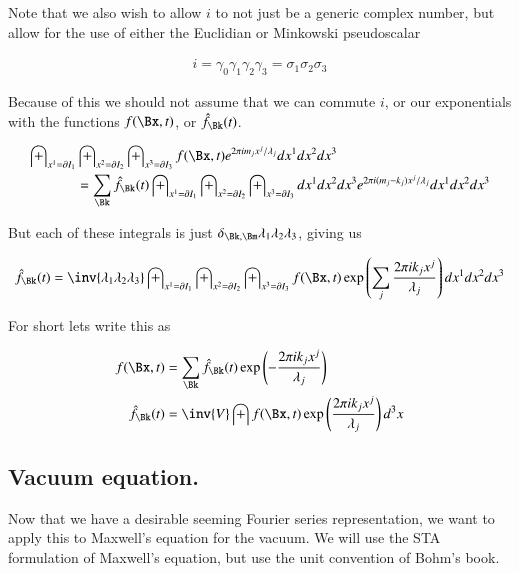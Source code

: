 \documentclass{article}
\begin{document}
Note that we also wish to allow $i$ to not just be a generic complex number, but allow for the use of either the Euclidian or Minkowski pseudoscalar

\begin{align*}
i = \gamma_0 \gamma_1 \gamma_2 \gamma_3 = \sigma_1 \sigma_2 \sigma_3
\end{align*}

Because of this we should not assume that we can commute $i$, or our exponentials with the functions $f(\Bx,t)$, or $\hat{f}_{\Bk}(t)$.

\begin{align*}
\int_{x^1 = \partial I_1} &\int_{x^2 = \partial I_2} \int_{x^3 = \partial I_3} f(\Bx, t) 
e^{ 2 \pi i m_j x^j/\lambda_j}
dx^1 dx^2 dx^3 \\
&= \sum_{\Bk} \hat{f}_{\Bk}(t) \int_{x^1 = \partial I_1} \int_{x^2 = \partial I_2} \int_{x^3 = \partial I_3} dx^1 dx^2 dx^3 e^{ 2 \pi i (m_j - k_j) x^j/\lambda_j} dx^1 dx^2 dx^3
\end{align*}

But each of these integrals is just $\delta_{\Bk,\Bm} \lambda_1 \lambda_2 \lambda_3$, giving us

\begin{align*}
\hat{f}_{\Bk}(t)
&= \inv{\lambda_1 \lambda_2 \lambda_3 } \int_{x^1 = \partial I_1} \int_{x^2 = \partial I_2} \int_{x^3 = \partial I_3} f(\Bx, t) \exp\left( \sum_j \frac{2 \pi i k_j x^j}{\lambda_j} \right) dx^1 dx^2 dx^3 \\
\end{align*}

For short lets write this as

\begin{align}
f(\Bx, t) &= \sum_{\Bk} \hat{f}_{\Bk}(t) \exp\left( - \frac{2 \pi i k_j x^j }{\lambda_j} \right) \\
\hat{f}_{\Bk}( t) &= \inv{V} \int f(\Bx, t) \exp\left( \frac{2 \pi i k_j x^j}{\lambda_j} \right) d^3 x
\end{align}

\subsection{ Vacuum equation. }

Now that we have a desirable seeming Fourier series representation, we 
want to apply this to Maxwell's equation for the vacuum.  We will use the 
STA formulation of Maxwell's equation, but use the unit convention of Bohm's
book.
\end{document}
